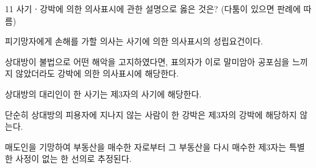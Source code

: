 \begin{question}{11}
사기ㆍ강박에 의한 의사표시에 관한 설명으로 옳은 것은? (다툼이 있으면 판례에 따름)
\begin{choices}
  \item 피기망자에게 손해를 가할 의사는 사기에 의한 의사표시의 성립요건이다.
  \item 상대방이 불법으로 어떤 해악을 고지하였다면, 표의자가 이로 말미암아 공포심을 느끼지 않았더라도 강박에 의한 의사표시에 해당한다.
  \item 상대방의 대리인이 한 사기는 제3자의 사기에 해당한다.
  \item 단순히 상대방의 피용자에 지나지 않는 사람이 한 강박은 제3자의 강박에 해당하지 않는다.
  \item 매도인을 기망하여 부동산을 매수한 자로부터 그 부동산을 다시 매수한 제3자는 특별한 사정이 없는 한 선의로 추정된다.
\end{choices}
\end{question}
